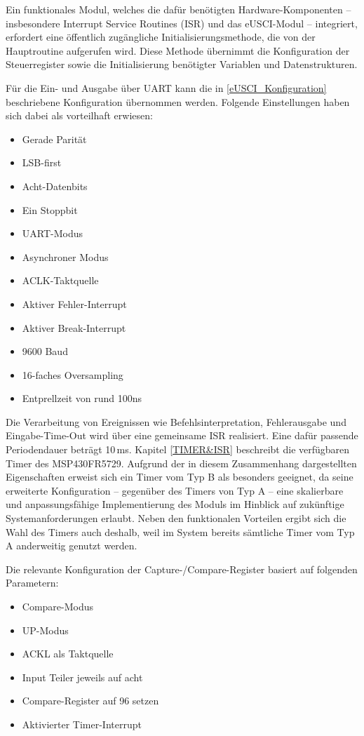 Ein funktionales Modul, welches die daf\"ur ben\"otigten Hardware-Komponenten – insbesondere Interrupt Service Routines (ISR) und das eUSCI-Modul – integriert, erfordert eine \"offentlich zug\"angliche Initialisierungsmethode, die von der Hauptroutine aufgerufen wird. Diese Methode \"ubernimmt die Konfiguration der Steuerregister sowie die Initialisierung ben\"otigter Variablen und Datenstrukturen.

F\"ur die Ein- und Ausgabe \"uber UART kann die in \ref{eUSCI_Konfiguration} beschriebene Konfiguration \"ubernommen werden. Folgende Einstellungen haben sich dabei als vorteilhaft erwiesen:

\begin{itemize}
	\item Gerade Parit\"at
	\item LSB-first
	\item Acht-Datenbits
	\item Ein Stoppbit
	\item UART-Modus
	\item Asynchroner Modus
	\item ACLK-Taktquelle
	\item Aktiver Fehler-Interrupt
	\item Aktiver Break-Interrupt
	\item 9600 Baud
	\item 16-faches Oversampling
	\item Entprellzeit von rund 100ns
\end{itemize}

Die Verarbeitung von Ereignissen wie Befehlsinterpretation, Fehlerausgabe und Eingabe-Time-Out wird \"uber eine gemeinsame ISR realisiert. Eine daf\"ur passende Periodendauer betr\"agt 10\,ms. Kapitel \ref{TIMER&ISR} beschreibt die verf\"ugbaren Timer des MSP430FR5729. Aufgrund der in diesem Zusammenhang dargestellten Eigenschaften erweist sich ein Timer vom Typ B als besonders geeignet, da seine erweiterte Konfiguration -- gegen\"uber des Timers von Typ A -- eine skalierbare und anpassungsf\"ahige Implementierung des Moduls im Hinblick auf zuk\"unftige Systemanforderungen erlaubt. Neben den funktionalen Vorteilen ergibt sich die Wahl des Timers auch deshalb, weil im System bereits s\"amtliche Timer vom Typ A anderweitig genutzt werden.

Die relevante Konfiguration der Capture-/Compare-Register basiert auf folgenden Parametern:

\begin{itemize}
	\item Compare-Modus
	\item UP-Modus
	\item ACKL als Taktquelle
	\item Input Teiler jeweils auf acht
	\item Compare-Register auf 96 setzen
	\item Aktivierter Timer-Interrupt
\end{itemize}

